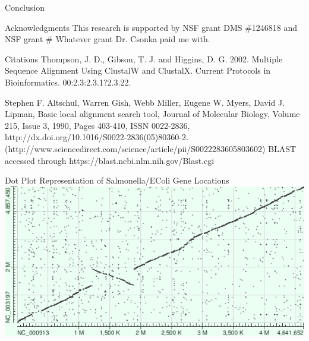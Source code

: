 \documentclass[final]{beamer}
\begin{document}
\begin{frame}{}
\begin{columns}[t]
\begin{column}{.32 \linewidth}
\begin{block}{\large Conclusion}
\begin{itemize}
				\end{itemize}
				
				
				
			\end{block}
			
			
			
			\begin{block}{Acknowledgments}
				This research is supported by NSF grant DMS \#1246818 and NSF grant \# Whatever grant Dr. Csonka paid me with.
			\end{block}
			\begin{block}{Citations}
				\footnotesize
				Thompson, J. D., Gibson, T. J. and Higgins, D. G. 2002. Multiple Sequence Alignment Using ClustalW and ClustalX. Current Protocols in Bioinformatics. 00:2.3:2.3.1?2.3.22.
				
				Stephen F. Altschul, Warren Gish, Webb Miller, Eugene W. Myers, David J. Lipman, Basic local alignment search tool, Journal of Molecular Biology, Volume 215, Issue 3, 1990, Pages 403-410, ISSN 0022-2836, http://dx.doi.org/10.1016/S0022-2836(05)80360-2.
				(http://www.sciencedirect.com/science/article/pii/S0022283605803602)
				BLAST accessed through https://blast.ncbi.nlm.nih.gov/Blast.cgi
				
			\end{block}
			\begin{block}{Dot Plot Representation of Salmonella/EColi Gene Locations}
				\includegraphics[scale = 1.25]{hit_matrixECSal.png}
			\end{block}
			
			
			
		\end{column}
		
	\end{columns}
	
\end{frame}
\end{document}
